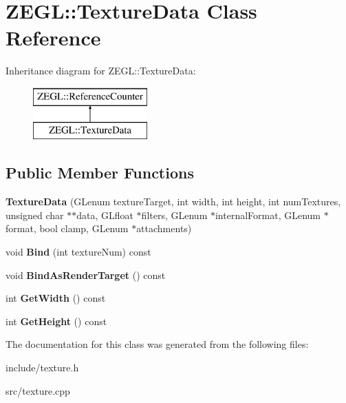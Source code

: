 \hypertarget{class_z_e_g_l_1_1_texture_data}{}\section{Z\+E\+G\+L\+:\+:Texture\+Data Class Reference}
\label{class_z_e_g_l_1_1_texture_data}
Inheritance diagram for Z\+E\+G\+L\+:\+:Texture\+Data\+:\begin{figure}[H]
\begin{center}
\leavevmode
\includegraphics[height=2.000000cm]{class_z_e_g_l_1_1_texture_data}
\end{center}
\end{figure}
\subsection*{Public Member Functions}
\begin{DoxyCompactItemize}
\item 
\hypertarget{class_z_e_g_l_1_1_texture_data_ab46f64eb53b9f4dd34c936620c0f6ddb}{}{\bfseries Texture\+Data} (G\+Lenum texture\+Target, int width, int height, int num\+Textures, unsigned char $\ast$$\ast$data, G\+Lfloat $\ast$filters, G\+Lenum $\ast$internal\+Format, G\+Lenum $\ast$format, bool clamp, G\+Lenum $\ast$attachments)\label{class_z_e_g_l_1_1_texture_data_ab46f64eb53b9f4dd34c936620c0f6ddb}

\item 
\hypertarget{class_z_e_g_l_1_1_texture_data_aded7e6ed8e417bf39f815a671a0d84f8}{}void {\bfseries Bind} (int texture\+Num) const \label{class_z_e_g_l_1_1_texture_data_aded7e6ed8e417bf39f815a671a0d84f8}

\item 
\hypertarget{class_z_e_g_l_1_1_texture_data_a8d9a3f90f7656e1740e7ed3462f6458f}{}void {\bfseries Bind\+As\+Render\+Target} () const \label{class_z_e_g_l_1_1_texture_data_a8d9a3f90f7656e1740e7ed3462f6458f}

\item 
\hypertarget{class_z_e_g_l_1_1_texture_data_a22d1c6acdece9d58b0d71ebcc45cea44}{}int {\bfseries Get\+Width} () const \label{class_z_e_g_l_1_1_texture_data_a22d1c6acdece9d58b0d71ebcc45cea44}

\item 
\hypertarget{class_z_e_g_l_1_1_texture_data_ae32bf32bc742289a44460760ee23c269}{}int {\bfseries Get\+Height} () const \label{class_z_e_g_l_1_1_texture_data_ae32bf32bc742289a44460760ee23c269}

\end{DoxyCompactItemize}


The documentation for this class was generated from the following files\+:\begin{DoxyCompactItemize}
\item 
include/texture.\+h\item 
src/texture.\+cpp\end{DoxyCompactItemize}
